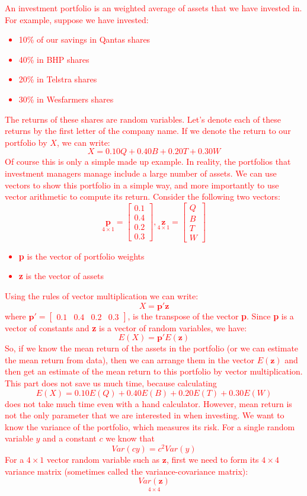 \documentclass[12pt]{report}
\begin{document}
\noindent \textcolor{red}{An investment portfolio is an weighted average of assets that we have invested in. For example, suppose we have invested:} 
\noindent \textcolor{red}{\begin{itemize}
		\item 10\% of our savings in Qantas shares
		\item 40\% in BHP shares
		\item 20\% in Telstra shares
		\item 30\% in Wesfarmers shares
\end{itemize}}
\noindent \textcolor{red}{The returns of these shares are random variables. Let's denote each of these returns by the first letter of the company name. If we denote the return to our portfolio by $X$, we can write:$$X = 0.10Q+0.40B+0.20T+0.30W$$ Of course this is only a simple made up example. In reality, the portfolios that investment managers manage include a large number of assets. We can use vectors to show this portfolio in a simple way, and more importantly to use vector arithmetic to compute its return. Consider the following two vectors:{$$\underset{4\times1}{\textbf{p}}
		=
		\begin{bmatrix}
		0.1 \\
		0.4 \\
		0.2 \\
		0.3
		\end{bmatrix} , 
		\underset{4\times1}{\textbf{z}}
		=
		\begin{bmatrix}
		Q \\
		B \\
		T \\
		W
		\end{bmatrix}
		$$}
\begin{itemize}
	\item \textbf{p} is the vector of portfolio weights
	\item \textbf{z} is the vector of assets
\end{itemize} 
Using the rules of vector multiplication we can write: $$X = \textbf{p}'\textbf{z}$$ where $\textbf{p}' = \begin{bmatrix}
0.1 & 0.4 & 0.2 & 0.3
\end{bmatrix}$, is the transpose of the vector \textbf{p}. Since \textbf{p} is a vector of constants and \textbf{z} is a vector of random variables, we have: $$E(X) = \textbf{p}'E(\textbf{z})$$ So, if we know the mean return of the assets in the portfolio (or we can estimate the mean return from data), then we can arrange them in the vector $E(\textbf{z})$ and then get an estimate of the mean return to this portfolio by vector multiplication. This part does not save us much time, because calculating $$E(X) = 0.10E(Q) + 0.40E(B) + 0.20E(T) + 0.30E(W)$$ does not take much time even with a hand calculator. However, mean return is not the only parameter that we are interested in when investing. We want to know the variance of the portfolio, which measures its risk. For a single random variable $y$ and a constant $c$ we know that $$Var(cy) = c^2Var(y)$$ For a $4\times 1$ vector random variable such as $\textbf{z}$, first we need to form its $4\times 4$ variance matrix (sometimes called the variance-covariance matrix):$$\underset{4\times4}{Var(\textbf{z})}
$$}
\end{document}
